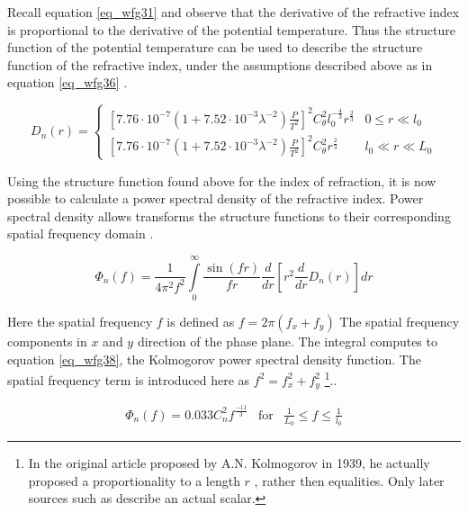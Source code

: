 \documentclass{article}
\begin{document}
Recall equation \ref{eq_wfg31} and observe that the derivative of the  refractive index is proportional to the derivative of the potential temperature. Thus the structure function of the potential temperature can be used to describe the structure function of the refractive index, under the assumptions described above as in equation \ref{eq_wfg36} \cite{zernikeMatlab}.

\begin{equation}
D_n(r) = 
\begin{cases}
\left[7.76 \cdot 10^{-7} \left(1 + 7.52 \cdot 10^{-3} \lambda^{-2} \right) \frac{P}{T^2} \right]^2 C_\theta^2 l_0^{-\frac{4}{3}} r^{\frac{2}{3}} & 0 \leq r \ll l_0\\
\left[7.76 \cdot 10^{-7} \left(1 + 7.52 \cdot 10^{-3} \lambda^{-2} \right) \frac{P}{T^2} \right]^2 C_\theta^2 r^{\frac{2}{3}} & l_0 \ll r \ll L_0 
\end{cases}
\label{eq_wfg36}
\end{equation}

Using the structure function found above for the index of refraction, it is now possible to calculate a power spectral density of the refractive index. Power spectral density allows transforms the structure functions to their corresponding spatial frequency domain \cite{zernikeMatlab}.

\begin{equation}
\Phi_n(f) = \frac{1}{4 \pi^2 f^2} \int \limits_0^\infty \frac{\sin(f r)}{f r} \frac{d}{dr} \left[ r^2 \frac{d}{dr} D_n(r) \right] dr
\label{eq_wfg37}
\end{equation}

Here the spatial frequency $f$ is defined as $f = 2 \pi (f_x + f_y)$ The spatial frequency components in $x$ and $y$ direction of the phase plane. The integral computes to equation \ref{eq_wfg38}, the Kolmogorov power spectral density function. The spatial frequency term is introduced here as $f^2 =f_x^2 + f_y^2$ \cite{zernikeMatlab} \cite{lectureNotes} \footnote{In the original article proposed by A.N. Kolmogorov in 1939, he actually proposed a proportionality to a length $r$ \cite{kolmogorov1941local}, rather then equalities. Only later sources such as \cite{zernikeMatlab} describe an actual scalar.}.. 

\begin{equation}
\begin{matrix}
\Phi_n(f) = 0.033 C_n^2 f^{\frac{-11}{3}} & \text{for} & \frac{1}{L_0} \leq f \leq \frac{1}{l_0}
\end{matrix}
\label{eq_wfg38}
\end{equation}
\end{document}
